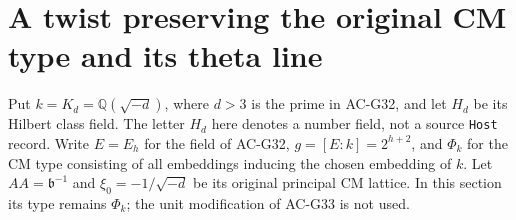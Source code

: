 \section{A twist preserving the original CM type and its theta line}
\label{sec:source-type-twist}

Put $k=K_d=\mathbb Q(\sqrt{-d})$, where $d>3$ is the
prime in AC-G32, and let $H_d$ be its Hilbert class field.
The letter $H_d$ here denotes a number field, not a source
\texttt{Host} record.  Write $E=E_h$ for the field of AC-G32,
$g=[E:k]=2^{h+2}$, and $\Phi_k$ for the CM type consisting
of all embeddings inducing the chosen embedding of $k$.
Let $AA=\mathfrak b^{-1}$ and $\xi_0=-1/\sqrt{-d}$ be
its original principal CM lattice.  In this section its type
remains $\Phi_k$; the unit modification of AC-G33 is not used.

